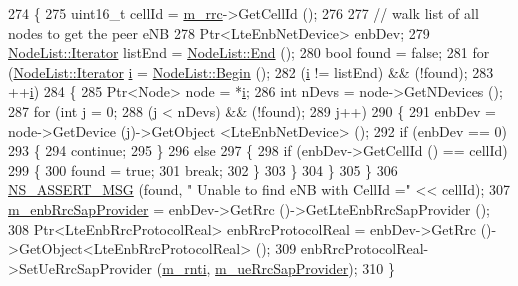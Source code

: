 \begin{DoxyCode}
274 \{
275   uint16\_t cellId = \hyperlink{classns3_1_1LteUeRrcProtocolReal_a8fdc7ce050a1325bac8fd0a851f22a1c}{m\_rrc}->GetCellId ();
276 
277   \textcolor{comment}{// walk list of all nodes to get the peer eNB}
278   Ptr<LteEnbNetDevice> enbDev;
279   \hyperlink{classns3_1_1NodeList_a9e2679a94efb4f0066cc21e65440364d}{NodeList::Iterator} listEnd = \hyperlink{classns3_1_1NodeList_a027a558c16e6078e25c7ffc67becb559}{NodeList::End} ();
280   \textcolor{keywordtype}{bool} found = \textcolor{keyword}{false};
281   \textcolor{keywordflow}{for} (\hyperlink{classns3_1_1NodeList_a9e2679a94efb4f0066cc21e65440364d}{NodeList::Iterator} \hyperlink{bernuolliDistribution_8m_a6f6ccfcf58b31cb6412107d9d5281426}{i} = \hyperlink{classns3_1_1NodeList_a93d2211831f5cb71d1dbb721e2721d7f}{NodeList::Begin} (); 
282        (\hyperlink{bernuolliDistribution_8m_a6f6ccfcf58b31cb6412107d9d5281426}{i} != listEnd) && (!found); 
283        ++\hyperlink{bernuolliDistribution_8m_a6f6ccfcf58b31cb6412107d9d5281426}{i})
284     \{
285       Ptr<Node> node = *\hyperlink{bernuolliDistribution_8m_a6f6ccfcf58b31cb6412107d9d5281426}{i};
286       \textcolor{keywordtype}{int} nDevs = node->GetNDevices ();
287       \textcolor{keywordflow}{for} (\textcolor{keywordtype}{int} j = 0; 
288            (j < nDevs) && (!found);
289            j++)
290         \{
291           enbDev = node->GetDevice (j)->GetObject <LteEnbNetDevice> ();
292           \textcolor{keywordflow}{if} (enbDev == 0)
293             \{
294               \textcolor{keywordflow}{continue};
295             \}
296           \textcolor{keywordflow}{else}
297             \{
298               \textcolor{keywordflow}{if} (enbDev->GetCellId () == cellId)
299                 \{
300                   found = \textcolor{keyword}{true};
301                   \textcolor{keywordflow}{break};
302                 \}
303             \}
304         \}
305     \}
306   \hyperlink{assert_8h_aff5ece9066c74e681e74999856f08539}{NS\_ASSERT\_MSG} (found, \textcolor{stringliteral}{" Unable to find eNB with CellId ="} << cellId);
307   \hyperlink{classns3_1_1LteUeRrcProtocolReal_a0293106f91668a44472470093622ad7b}{m\_enbRrcSapProvider} = enbDev->GetRrc ()->GetLteEnbRrcSapProvider ();
308   Ptr<LteEnbRrcProtocolReal> enbRrcProtocolReal = enbDev->GetRrc ()->GetObject<LteEnbRrcProtocolReal> ();
309   enbRrcProtocolReal->SetUeRrcSapProvider (\hyperlink{classns3_1_1LteUeRrcProtocolReal_a8474d4cb6038e0e43ee542f7ce7b193d}{m\_rnti}, \hyperlink{classns3_1_1LteUeRrcProtocolReal_a1d594fbb2755388a84d4d1d53298b0f8}{m\_ueRrcSapProvider});
310 \}
\end{DoxyCode}


